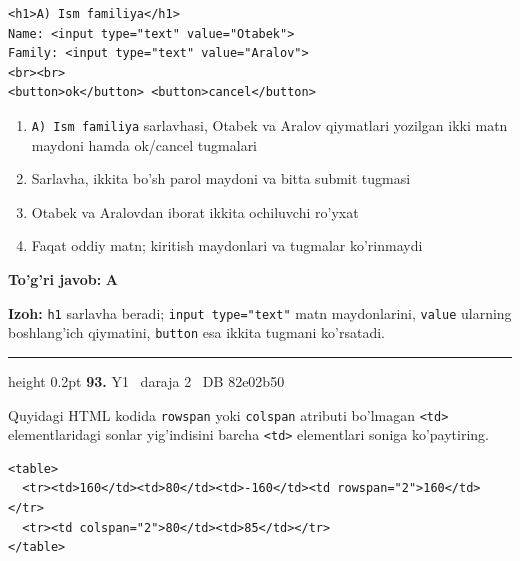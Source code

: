 \documentclass[10pt,a4paper,oneside]{article}
\begin{document}
\par
\begin{lstlisting}
<h1>A) Ism familiya</h1>
Name: <input type="text" value="Otabek">
Family: <input type="text" value="Aralov">
<br><br>
<button>ok</button> <button>cancel</button>
\end{lstlisting}

\begin{enumerate}[label=\Alph*),leftmargin=9mm]
\item \texttt{A) Ism familiya} sarlavhasi, Otabek va Aralov qiymatlari yozilgan ikki matn maydoni hamda ok/cancel tugmalari
\item Sarlavha, ikkita bo'sh parol maydoni va bitta submit tugmasi
\item Otabek va Aralovdan iborat ikkita ochiluvchi ro'yxat
\item Faqat oddiy matn; kiritish maydonlari va tugmalar ko'rinmaydi
\end{enumerate}
\begin{tcolorbox}[enhanced,breakable,colback=teal!4,colframe=teal!45!black,boxrule=0.45pt,arc=1.2mm,left=2.8mm,right=2.8mm,top=2mm,bottom=2mm,before skip=2mm,after skip=2mm]
\textbf{\color{teal}To'g'ri javob:} \textbf{A}
\par\smallskip
\textbf{Izoh:} \texttt{h1} sarlavha beradi; \texttt{input type="text"} matn maydonlarini, \texttt{value} ularning boshlang'ich qiymatini, \texttt{button} esa ikkita tugmani ko'rsatadi.
\end{tcolorbox}
\vspace{2mm}\hrule height 0.2pt \vspace{4mm}
\hypertarget{q93}{\textbf{\color{ink}93.}}  {\color{muted}\scriptsize Y1 \textbullet\ daraja 2 \textbullet\ DB 82e02b50}
\par
Quyidagi HTML kodida \texttt{rowspan} yoki \texttt{colspan} atributi bo'lmagan \texttt{\textless{}td\textgreater{}} elementlaridagi sonlar yig'indisini barcha \texttt{\textless{}td\textgreater{}} elementlari soniga ko'paytiring.

\par
\begin{lstlisting}
<table>
  <tr><td>160</td><td>80</td><td>-160</td><td rowspan="2">160</td></tr>
  <tr><td colspan="2">80</td><td>85</td></tr>
</table>
\end{lstlisting}
\end{document}
